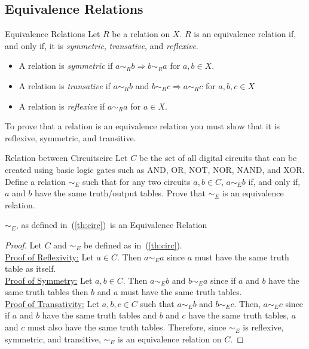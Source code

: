 \subsection{Equivalence Relations}
\begin{definition}{Equivalence Relations}{}
    Let $R$ be a relation on $X$. $R$ is an equivalence relation if, and only if, it is \textit{symmetric}, \textit{transative}, and \textit{reflexive}.
    \begin{itemize}
        \item A relation is \textit{symmetric} if $a \sim_R b \Rightarrow b \sim_R a$ for $a, b \in X$.
        \item A relation is \textit{transative} if $a \sim_R b$ and $b \sim_R c \Rightarrow a \sim_R c$ for $a, b, c \in X$
        \item A relation is \textit{reflexive} if $a \sim_R a$ for $a \in X$.
    \end{itemize}
    To prove that a relation is an equivalence relation you must show that it is reflexive, symmetric, and transitive.
\end{definition}

\begin{question}{Relation between Circuits}{circ}
    Let $C$ be the set of all digital circuits that can be created using basic logic gates such as AND, OR, NOT, NOR, NAND, and XOR. Define a relation $\sim_E$  such that for any two circuits $a, b \in C$, $a \sim_E b$ if, and only if, $a$ and $b$ have the same truth/output tables. Prove that $\sim_E$ is an equivalence relation.
\end{question}

\begin{tcolorbox}[colback=pink!50]
\begin{theorem}
    $\sim_E$, as defined in~(\ref{th:circ})~is an Equivalence Relation
\end{theorem}
\begin{proof}
    Let $C$ and $\sim_E$ be defined as in~(\ref{th:circ}). \\
    \hspace*{2em}\underline{Proof of Reflexivity:} Let $a \in C$. Then $a \sim_E a$ since $a$ must have the same truth table as itself. \\
    \hspace*{2em}\underline{Proof of Symmetry:} Let $a, b \in C$. Then $a \sim_E b$ and $b \sim_E a$ since if $a$ and $b$ have the same truth tables then $b$ and $a$ must have the same truth tables. \\
    \hspace*{2em}\underline{Proof of Transativity:} Let $a, b, c \in C$ such that $a \sim_E b$ and $b \sim_E c$. Then, $a \sim_E c$ since if $a$ and $b$ have the same truth tables and $b$ and $c$ have the same truth tables, $a$ and $c$ must also have the same truth tables.
    Therefore, since $\sim_E$ is reflexive, symmetric, and transitive, $\sim_E$ is an equivalence relation on $C$.
\end{proof}
\end{tcolorbox}
